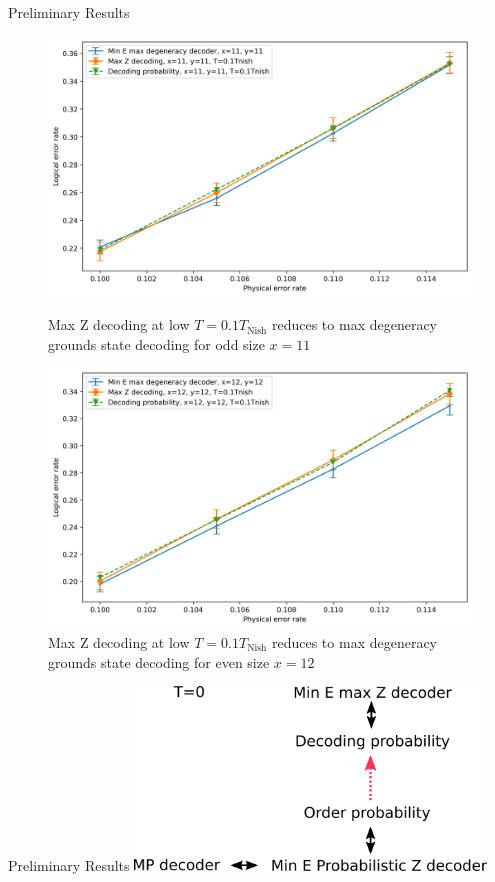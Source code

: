 \documentclass{dfki}
\begin{document}
\begin{frame}{Preliminary Results}
	\begin{figure}[h!]
		\centering
		\begin{minipage}{0.45\textwidth}
			\centering
			\includegraphics[width=\textwidth]{fig/MineEMaxG_DecProb01_LowTMaxZ_x11.png}
			\caption{Max Z decoding at low $T=0.1T_{\text{Nish}}$ reduces to max degeneracy grounds state decoding for odd size $x=11$}
		\end{minipage} \hfill
		\begin{minipage}{0.45\textwidth}
			\centering
			\includegraphics[width=\textwidth]{fig/MineEMaxG_DecProb01_LowTMaxZ_x12.png}
			\caption{Max Z decoding at low $T=0.1T_{\text{Nish}}$ reduces to max degeneracy grounds state decoding for even size $x=12$}
		\end{minipage}
	\end{figure}
\end{frame}

\begin{frame}{Preliminary Results}
	\center
	\includegraphics[width=0.7\textwidth]{fig/Optimization_potential.png}
\end{frame}
\end{document}
